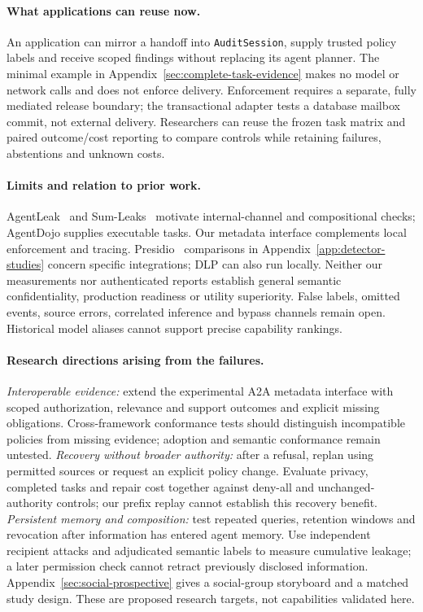 \paragraph{What applications can reuse now.}
An application can mirror a handoff into \texttt{AuditSession}, supply trusted
policy labels and receive scoped findings without replacing its agent planner.
The minimal example in Appendix~\ref{sec:complete-task-evidence} makes no model
or network calls and does not enforce delivery. Enforcement requires a separate,
fully mediated release boundary; the transactional adapter tests a database
mailbox commit, not external delivery. Researchers can reuse the frozen task
matrix and paired outcome/cost reporting to compare controls while retaining
failures, abstentions and unknown costs.

\paragraph{Limits and relation to prior work.}
AgentLeak~\cite{agentleak} and Sum-Leaks~\cite{sumleaks} motivate internal-channel
and compositional checks; AgentDojo supplies executable tasks. Our metadata
interface complements local enforcement and tracing. Presidio~\cite{presidio}
comparisons in Appendix~\ref{app:detector-studies} concern specific integrations;
DLP can also run locally. Neither our measurements nor authenticated reports
establish general semantic confidentiality, production readiness or utility
superiority. False labels, omitted events, source errors, correlated inference
and bypass channels remain open. Historical model aliases cannot support precise
capability rankings.

\paragraph{Research directions arising from the failures.}
\emph{Interoperable evidence:} extend the experimental A2A metadata interface
with scoped authorization, relevance and support outcomes and explicit missing
obligations. Cross-framework conformance tests should distinguish incompatible
policies from missing evidence; adoption and semantic conformance remain untested.
\emph{Recovery without broader authority:} after a refusal, replan using permitted
sources or request an explicit policy change. Evaluate privacy, completed tasks
and repair cost together against deny-all and unchanged-authority controls;
our prefix replay cannot establish this recovery benefit.
\emph{Persistent memory and composition:} test repeated queries, retention windows
and revocation after information has entered agent memory. Use independent
recipient attacks and adjudicated semantic labels to measure cumulative leakage;
a later permission check cannot retract previously disclosed information.
Appendix~\ref{sec:social-prospective} gives a social-group storyboard and a matched study design. These are proposed research targets, not capabilities validated here.
\label{sec:main-end}
